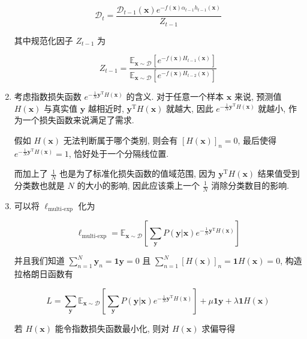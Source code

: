 \documentclass[answers]{exam}  %
\begin{document}
\begin{questions}
\begin{solution}
\begin{enumerate}
            $$
              \mathcal{D}_{t} = \frac{\mathcal{D}_{t-1}(\bm{x})e^{-f(\bm{x})\alpha_{t-1}h_{t-1}(\bm{x})}}{Z_{t-1}}
            $$

            其中规范化因子 $Z_{t-1}$ 为

            $$
              Z_{t-1} = \frac{\mathbb{E}_{\bm{x}\sim \mathcal{D}}[e^{-f(\bm{x})H_{t-1}(\bm{x})}]}{\mathbb{E}_{\bm{x}\sim \mathcal{D}}[e^{-f(\bm{x})H_{t-2}(\bm{x})}]}
            $$

      \item

            考虑指数损失函数 $e^{-\frac{1}{N}\bm{y}^{\mathrm{T}}H(\bm{x})}$ 的含义. 对于任意一个样本 $\bm{x}$ 来说, 预测值 $H(\bm{x})$ 与真实值 $\bm{y}$ 越相近时, $\bm{y}^{\mathrm{T}}H(\bm{x})$ 就越大, 因此 $e^{-\frac{1}{N}\bm{y}^{\mathrm{T}}H(\bm{x})}$ 就越小, 作为一个损失函数来说满足了需求.

            假如 $H(\bm{x})$ 无法判断属于哪个类别, 则会有 $[H(\bm{x})]_{n} = 0$, 最后使得 $e^{-\frac{1}{N}\bm{y}^{\mathrm{T}}H(\bm{x})}=1$, 恰好处于一个分隔线位置.

            而加上了 $\frac{1}{N}$ 也是为了标准化损失函数的值域范围, 因为 $\bm{y}^{\mathrm{T}}H(\bm{x})$ 结果值受到分类数也就是 $N$ 的大小的影响, 因此应该乘上一个 $\frac{1}{N}$ 消除分类数目的影响.

      \item

            可以将 $\ell_{\text{multi-exp}}$ 化为

            $$
              \ell_{\text{multi-exp}} = \mathbb{E}_{\bm{x}\sim \mathcal{D}}[\sum_{\bm{y}}P(\bm{y}|\bm{x})e^{-\frac{1}{N}\bm{y}^{\mathrm{T}}H(\bm{x})}]
            $$

            并且我们知道 $\sum_{n=1}^{N}\bm{y}_{n}=\bm{1}\bm{y}=0$ 且 $\sum_{n=1}^{N}[H(\bm{x})]_{n}=\bm{1}H(\bm{x})=0$, 构造拉格朗日函数有

            $$
              L = \sum_{\bm{y}}\mathbb{E}_{\bm{x}\sim \mathcal{D}}[\sum_{\bm{y}}P(\bm{y}|\bm{x})e^{-\frac{1}{N}\bm{y}^{\mathrm{T}}H(\bm{x})}] + \mu \bm{1}\bm{y} + \lambda \bm{1}H(\bm{x})
            $$

            若 $H(\bm{x})$ 能令指数损失函数最小化, 则对 $H(\bm{x})$ 求偏导得


\end{enumerate}
\end{solution}
\end{questions}
\end{document}
